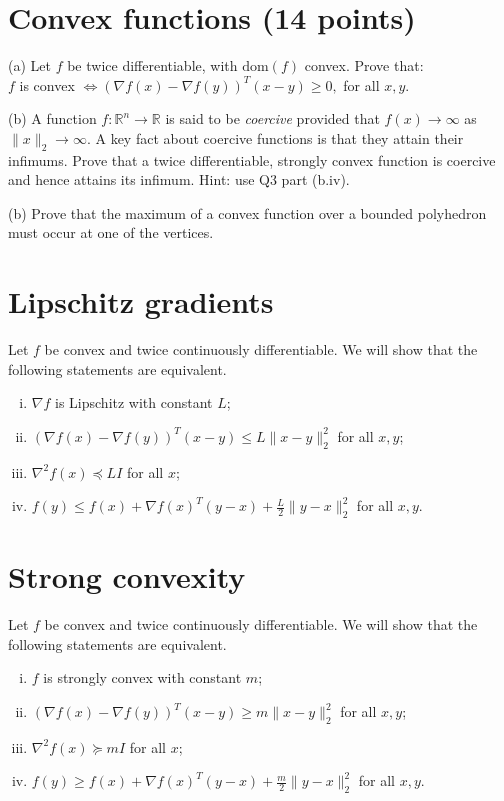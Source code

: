 \documentclass{article}
\theoremstyle{remark}
\theoremstyle{definition}
\def\R{\mathbb{R}}
\begin{document}
\section{Convex functions (14 points)}


\bigskip
\noindent
(a) Let $f$ be twice differentiable, with $\mathrm{dom}(f)$ convex.
Prove that: \\

$f$ is convex $\iff (\nabla f(x) - \nabla f(y))^T (x-y) \geq 0,$ for all $x,y$. 


\bigskip
\noindent
(b) A function $f : \R^n \to \R$ is said to be {\it coercive} provided
that $f(x) \to \infty$ as $\|x\|_2 \to \infty$.  A key fact about coercive
functions is that they attain their infimums.  Prove that a twice
differentiable, strongly convex function is coercive and hence attains its
infimum. Hint: use Q3 part (b.iv).  

\bigskip
\noindent
(b) Prove that the maximum of a convex function over a bounded
polyhedron must occur at one of the vertices.

\section{Lipschitz gradients}


\bigskip
\noindent
Let $f$ be convex and twice continuously differentiable. We will show that the following statements are equivalent.
\begin{enumerate}[i.]
\item $\nabla f$ is Lipschitz with constant $L$;
\item $(\nabla f(x) - \nabla f(y))^T(x-y) \leq L \|x-y\|_2^2$ for all
  $x,y$; 
\item $\nabla^2 f(x) \preceq LI$ for all $x$;
\item $f(y) \leq f(x) + \nabla f(x)^T (y-x) + \frac{L}{2} \|y-x\|_2^2$
  for all $x,y$.
\end{enumerate}


\section{Strong convexity}%
\label{sec:strong_convexity}


\bigskip
\noindent

Let $f$ be convex and twice continuously differentiable. We will show that the following statements are equivalent.
\begin{enumerate}[i.]
\item $f$ is strongly convex with constant $m$;
\item $(\nabla f(x) - \nabla f(y))^T(x-y) \geq m \|x-y\|_2^2$ for all
  $x,y$;
\item $\nabla^2 f(x) \succeq mI$ for all $x$;
\item $f(y) \geq f(x) + \nabla f(x)^T (y-x) + \frac{m}{2}
  \|y-x\|_2^2$ for all $x,y$.
\end{enumerate}
\end{document}
